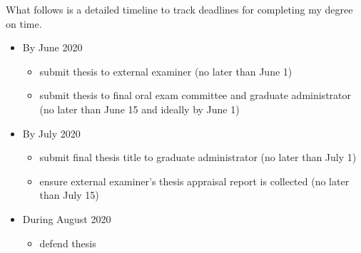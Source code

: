 \documentclass[11pt]{article}
\begin{document}
What follows is a detailed timeline to track deadlines for completing my degree on time.
\begin{itemize}
\item By June 2020
\begin{itemize}
	\item submit thesis to external examiner (no later than June 1)
	\item submit thesis to final oral exam committee and graduate administrator (no later than June 15 and ideally by June 1)
\end{itemize}
\item By July 2020
\begin{itemize}
\item submit final thesis title to graduate administrator (no later than July 1)
\item ensure external examiner's thesis appraisal report is collected (no later than July 15)
\end{itemize}
\item During August 2020
\begin{itemize}
\item defend thesis
\end{itemize}
\end{itemize}



\end{document}
